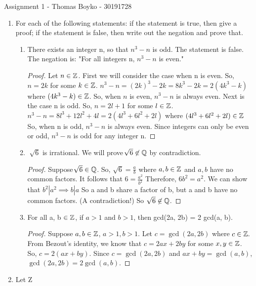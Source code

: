 \documentclass{article}
\begin{document}
\huge Assignment 1 - Thomas Boyko - 30191728
\normalsize \nl
\begin{enumerate}
 
\item For each of the following statements: if the statement is true, then give a proof; if the
statement is false, then write out the negation and prove that.
\begin{enumerate}[label= (\alph*)]
\item There exists an integer n, so that $n^3 - n$ 
 is odd.\nl 
The statement is false. The negation is: "For all integers n, $n^3-n$ is even."
\begin{proof}
    Let $n \in \mathbb{Z} $.
    \nl First we will consider the case when n is even.
    \nl So, $n = 2k $ for some $k \in \mathbb{Z}$.
    \nl $n^3 - n = (2k)^3 - 2k = 8k^3 - 2k = 2(4k^3 - k)$ where $(4k^3 - k) \in \mathbb{Z}$.
    \nl So, when $n$ is even, $n^3-n$ is always even.
    \nl 
    \nl Next is the case n is odd.
    \nl So, $n = 2l+1$ for some $l \in \mathbb{Z}$.
    \nl $n^3 - n = 8 l^{3} + 12 l^{2} + 4 l = 2(4l^3+6l^2+2l)$ where $(4l^3+6l^2+2l) \in \mathbb{Z}$
    \nl So, when n is odd, $n^3-n$ is always even.
    \nl \nl Since integers can only be even or odd, $n^3-n$ is odd 
    for any integer n.
\end{proof}
\item$\sqrt[]{6}$ is irrational. \nl 
\nl We will prove $\sqrt[]{6} \not \in \mathbb{Q}$ by contradiction.
\nl \begin{proof}
    Suppose $\sqrt[]{6} \in \mathbb{Q}$.
    \nl So, $\sqrt{6} = \frac{a}{b}$ where $a,b \in \mathbb{Z}$ and $a,b$ have no common factors.
    \nl It follows that $6=\frac{a^2}{b^2}$
    \nl Therefore, $6b^2 = a^2$. 
    \nl We can show that $b^2 | a^2 \implies b|a$ 
    \nl So a and b share a factor of b, but a and b have no common factors. (A contradiction!)
    \nl So $\sqrt{6} \not\in\mathbb{Q}$.
\end{proof}
\item For all a, b $\in \mathbb{Z}$, if $a > 1$ and $b > 1$, then gcd(2a, 2b) = 2 gcd(a, b).
\nl \begin{proof}
    Suppose $a,b \in\mathbb{Z}$, $a>1,b>1$.
    \nl Let $c = \gcd(2a,2b)$ where $c\in\mathbb{Z}.$
    \nl From Bezout's identity, we know that $c=2ax+2by$ for some $x,y \in\mathbb{Z}$.
    \nl So, $c =2(ax+by)$.
    \nl Since $c = \gcd(2a,2b)$ and $ax+by = \gcd(a,b)$,
    \nl $\gcd(2a,2b) = 2\gcd(a,b)$.
\end{proof}
\end{enumerate}
\item Let Z

\end{enumerate}
\end{document}
